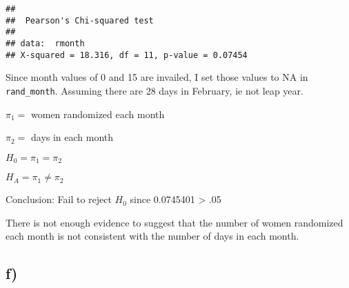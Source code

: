 \documentclass[]{article}
\newenvironment{Shaded}{\begin{snugshade}}{\end{snugshade}}
\newcommand{\KeywordTok}[1]{\textcolor[rgb]{0.13,0.29,0.53}{\textbf{#1}}}
\newcommand{\DataTypeTok}[1]{\textcolor[rgb]{0.13,0.29,0.53}{#1}}
\newcommand{\DecValTok}[1]{\textcolor[rgb]{0.00,0.00,0.81}{#1}}
\newcommand{\StringTok}[1]{\textcolor[rgb]{0.31,0.60,0.02}{#1}}
\newcommand{\OperatorTok}[1]{\textcolor[rgb]{0.81,0.36,0.00}{\textbf{#1}}}
\newcommand{\NormalTok}[1]{#1}
\begin{document}
\begin{verbatim}
## 
##  Pearson's Chi-squared test
## 
## data:  rmonth
## X-squared = 18.316, df = 11, p-value = 0.07454
\end{verbatim}

Since month values of 0 and 15 are invailed, I set those values to NA in
\texttt{rand\_month}. Assuming there are 28 days in February, ie not
leap year.

\(\pi_1 =\) women randomized each month

\(\pi_2 =\) days in each month

\(H_0 = \pi_1=\pi_2\)

\(H_A = \pi_1 \neq \pi_2\)

Conclusion: Fail to reject \(H_0\) since 0.0745401 \textgreater{} .05

There is not enough evidence to suggest that the number of women
randomized each month is not consistent with the number of days in each
month.

\subsection{f)}\label{f}

\begin{Shaded}
\end{Shaded}

\begin{Shaded}
\end{Shaded}
\end{document}
